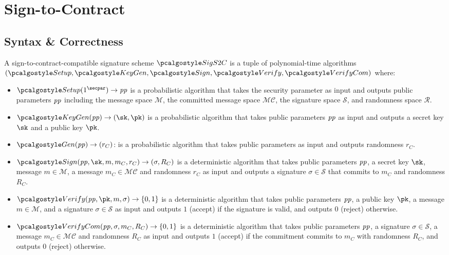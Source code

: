 \section{Sign-to-Contract}

\subsection{Syntax \& Correctness}

\begin{definition}
  A sign-to-contract-compatible signature scheme $\algo{SigS2C}$ is a tuple of polynomial-time algorithms $(\algo{Setup}, \algo{KeyGen}, \algo{Sign}, \algo{Verify}, \algo{VerifyCom})$ where:
  \begin{itemize}
    \item $\algo{Setup}(1^\secpar) \rightarrow \params$ is a probabilistic algorithm that takes the security parameter as input and outputs public parameters $\mathit{pp}$ including the message space $\mathcal{M}$, the committed message space $\mathcal{MC}$, the signature space $\mathcal{S}$, and randomness space $\mathcal{R}$.
    \item $\algo{KeyGen}(\params) \rightarrow (\sk, \pk)$ is a probabilistic algorithm that takes public parameters $\mathit{pp}$ as input and outputs a secret key $\sk$ and a public key $\pk$.
    \item $\algo{Gen}(\params) \rightarrow (r_C)$: is a probabilistic algorithm that takes public parameters \params as input and outputs randomness $r_C$.
    \item $\algo{Sign}(\params, \sk, m, m_C, r_C) \rightarrow (\sigma, R_C)$ is a deterministic algorithm that takes public parameters $\mathit{pp}$, a secret key $\sk$, message $m \in \mathcal{M}$, a message $m_C \in \mathcal{MC}$ and randomness $r_C$ as input and outputs a signature $\sigma \in \mathcal{S}$ that commits to $m_C$ and randomness $R_C$.
    \item $\algo{Verify}(\params, \pk, m, \sigma) \rightarrow \{0, 1\}$ is a deterministic algorithm that takes public parameters $\mathit{pp}$, a public key $\pk$, a message $m \in \mathcal{M}$, and a signature $\sigma \in \mathcal{S}$ as input and outputs $1$ (accept) if the signature is valid, and outputs $0$ (reject) otherwise.
    \item $\algo{VerifyCom}(\params, \sigma, m_C, R_C) \rightarrow \{0, 1\}$ is a deterministic algorithm that takes public parameters $\mathit{pp}$, a signature $\sigma \in \mathcal{S}$, a message $m_C \in \mathcal{MC}$ and randomness $R_C$ as input and outputs $1$ (accept) if the commitment commits to $m_C$ with randomness $R_C$, and outputs $0$ (reject) otherwise.
  \end{itemize}
\end{definition}


